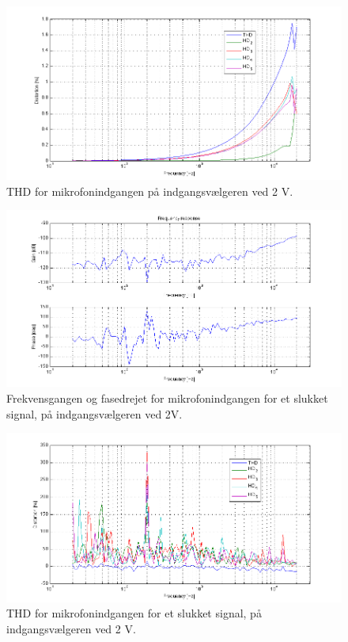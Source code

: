 \begin{figure}[h]
\centering
\includegraphics[width=\textwidth]{maalerapporter/indgangsvaelger/Indgangsvlger mic 2v thd.png}
\caption{THD for mikrofonindgangen på indgangsvælgeren ved 2 V.}
\label{fig:apind:thd2v}
\end{figure}


\begin{figure}[h]
\centering
\includegraphics[width=\textwidth]{maalerapporter/indgangsvaelger/Indgangsvlger mic 2v slukket frek.png}
\caption{Frekvensgangen og fasedrejet for mikrofonindgangen for et slukket signal, på indgangsvælgeren ved 2V.}
\label{fig:apind:frek2vslukket}
\end{figure}


\begin{figure}[h]
\centering
\includegraphics[width=\textwidth]{maalerapporter/indgangsvaelger/Indgangsvlger mic 2v slukket thd.png}
\caption{THD for mikrofonindgangen for et slukket signal, på indgangsvælgeren ved 2 V.}
\label{fig:apind:thd2vslukket}
\end{figure}

